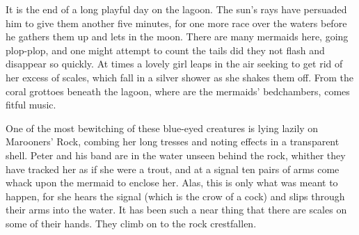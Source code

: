 

\begin{stagedir}
It is the end of a long playful day on the lagoon.
The sun's rays have persuaded him to give them another five minutes, for one more race over the waters before he gathers them up and lets in the moon.
There are many mermaids here, going plop-plop, and one might attempt to count the tails did they not flash and disappear so quickly.
At times a lovely girl leaps in the air seeking to get rid of her excess of scales, which fall in a silver shower as she shakes them off.
From the coral grottoes beneath the lagoon, where are the mermaids' bedchambers, comes fitful music.

One of the most bewitching of these blue-eyed creatures is lying lazily on Marooners' Rock, combing her long tresses and noting effects in a transparent shell.
Peter and his band are in the water unseen behind the rock, whither they have tracked her as if she were a trout, and at a signal ten pairs of arms come whack upon the mermaid to enclose her.
Alas, this is only what was meant to happen, for she hears the signal (which is the crow of a cock) and slips through their arms into the water.
It has been such a near thing that there are scales on some of their hands.
They climb on to the rock crestfallen.
\end{stagedir}

